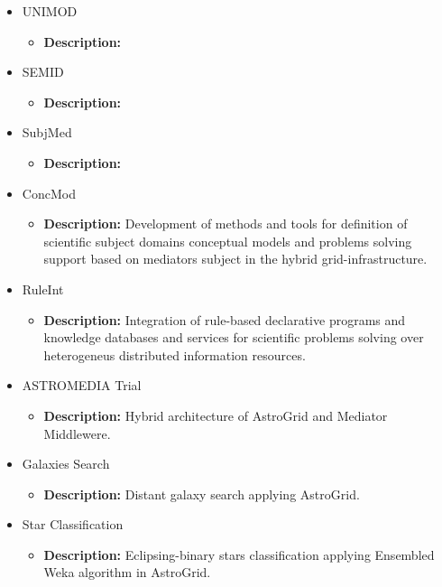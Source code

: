\begin{itemize}
\begin{itemize}
\begin{itemize}
\item \textbf{Description:} Methods and tools for supporting subject mediators
architecture in AstroGrid\footnote{\url{http://www.astrogrid.org/}}
infrastructure for the RVO.
\end{itemize}
\item UNIMOD
\begin{itemize}
\item \textbf{Description:}
\end{itemize}
\item SEMID
\begin{itemize}
\item \textbf{Description:}
\end{itemize}
\item SubjMed
\begin{itemize}
\item \textbf{Description:}
\end{itemize}
\item ConcMod
\begin{itemize}
\item \textbf{Description:} Development of methods and tools for definition of
scientific subject domains conceptual models and problems solving support based
on mediators subject in the hybrid grid-infrastructure.
\end{itemize}
\item RuleInt
\begin{itemize}
\item \textbf{Description:} Integration of rule-based declarative programs and
knowledge databases and services for scientific problems solving over
heterogeneus distributed information resources.
\end{itemize}
\item ASTROMEDIA Trial
\begin{itemize}
\item \textbf{Description:} Hybrid architecture of AstroGrid and Mediator
Middlewere.
\end{itemize}
\item Galaxies Search
\begin{itemize}
\item \textbf{Description:} Distant galaxy search applying AstroGrid.
\end{itemize}
\item Star Classification
\begin{itemize}
\item \textbf{Description:} Eclipsing-binary stars classification applying
Ensembled Weka algorithm in AstroGrid.
\end{itemize}
\end{itemize}
\end{itemize}

